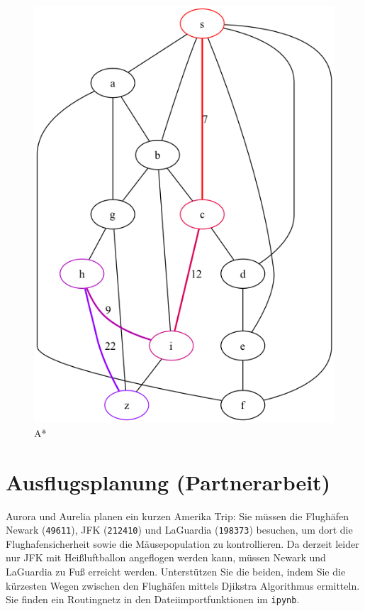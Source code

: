 \documentclass[a4paper,11pt]{report}
\begin{document}
    \begin{figure}[htbp]
        \centering
        \includegraphics[height=0.33\textheight]{notebooks/assets/aufgabe_05/astar}
        \caption{A*}
        \label{fig:astar_graph}
    \end{figure}

    \newpage

    \chapter{Ausflugsplanung (Partnerarbeit)}

    Aurora und Aurelia planen ein kurzen Amerika Trip:
    Sie müssen die Flughäfen Newark (\texttt{49611}), JFK (\texttt{212410}) und LaGuardia (\texttt{198373}) besuchen, um dort die Flughafensicherheit sowie die Mäusepopulation zu kontrollieren.
    Da derzeit leider nur JFK mit Heißluftballon angeflogen werden kann, müssen Newark und LaGuardia zu Fuß erreicht werden.
    Unterstützen Sie die beiden, indem Sie die kürzesten Wegen zwischen den Flughäfen mittels Djikstra Algorithmus ermitteln.
    Sie finden ein Routingnetz in den Dateiimportfunktionen im \texttt{ipynb}.
\end{document}

